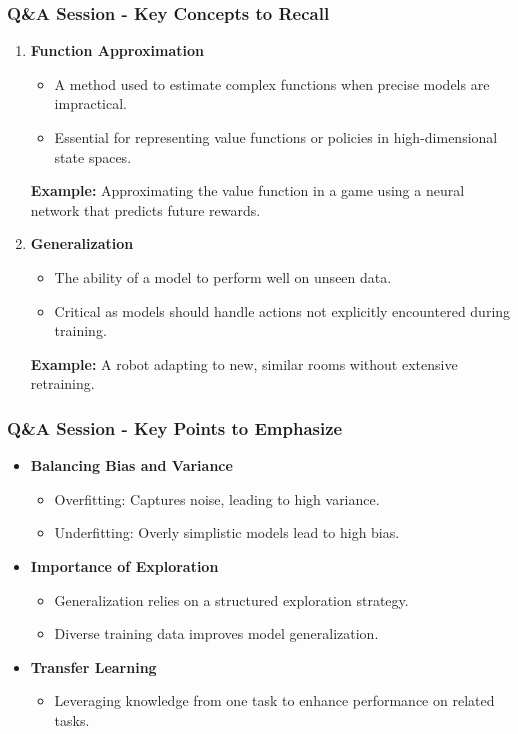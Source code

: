 \documentclass[aspectratio=169]{beamer}
\begin{document}
\begin{frame}[fragile]
  \frametitle{Q\&A Session - Key Concepts to Recall}
  \begin{enumerate}
    \item \textbf{Function Approximation}
    \begin{itemize}
      \item A method used to estimate complex functions when precise models are impractical.
      \item Essential for representing value functions or policies in high-dimensional state spaces.
    \end{itemize}
    \textbf{Example:} Approximating the value function in a game using a neural network that predicts future rewards.

    \item \textbf{Generalization}
    \begin{itemize}
      \item The ability of a model to perform well on unseen data.
      \item Critical as models should handle actions not explicitly encountered during training.
    \end{itemize}
    \textbf{Example:} A robot adapting to new, similar rooms without extensive retraining.
  \end{enumerate}
\end{frame}

\begin{frame}[fragile]
  \frametitle{Q\&A Session - Key Points to Emphasize}
  \begin{itemize}
    \item \textbf{Balancing Bias and Variance}
      \begin{itemize}
        \item Overfitting: Captures noise, leading to high variance.
        \item Underfitting: Overly simplistic models lead to high bias.
      \end{itemize}

    \item \textbf{Importance of Exploration}
      \begin{itemize}
        \item Generalization relies on a structured exploration strategy.
        \item Diverse training data improves model generalization.
      \end{itemize}

    \item \textbf{Transfer Learning}
      \begin{itemize}
        \item Leveraging knowledge from one task to enhance performance on related tasks.
      \end{itemize}
  \end{itemize}
\end{frame}
\end{document}
